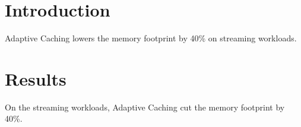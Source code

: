 \section{Introduction}
Adaptive Caching lowers the memory footprint by 40\% on streaming workloads.
\section{Results}
On the streaming workloads, Adaptive Caching cut the memory footprint by 40\%.
